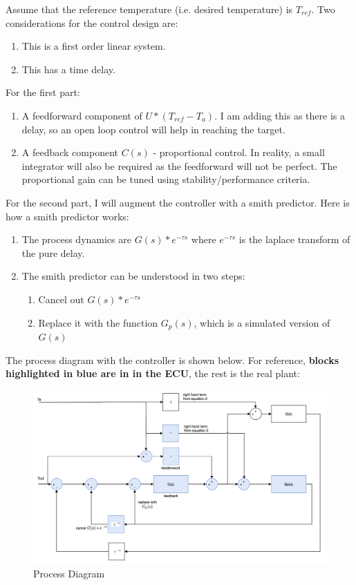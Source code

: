 Assume that the reference temperature (i.e. desired temperature) is \(T_{ref}\).
\noindent
\newline
\newline
Two considerations for the control design are:
\begin{enumerate}
  \item This is a first order linear system.
  \item This has a time delay.
\end{enumerate}
\noindent
For the first part:
\begin{enumerate}
  \item A feedforward component of \(U*(T_{ref} - T_a)\). I am adding this as there is a delay, so an open loop control will help in reaching the target.
  \item A feedback component \(C(s)\) - proportional control. In reality, a small integrator will also be required as the feedforward will not be perfect. The proportional gain can be tuned using stability/performance criteria.
\end{enumerate}
For the second part, I will augment the controller with a smith predictor. Here is how a smith predictor works:
\begin{enumerate}
  \item The process dynamics are \(G(s)*e^{-\tau s}\) where \(e^{-\tau s}\) is the laplace transform of the pure delay.
  \item The smith predictor can be understood in two steps:
  \begin{enumerate}
  \item Cancel out \(G(s)*e^{-\tau s}\)
  \item Replace it with the function \(G_p(s)\), which is a simulated version of \(G(s)\)
  \end{enumerate}
\end{enumerate}

\noindent
\newline
\newline
The process diagram with the controller is shown below. For reference, \textbf{blocks highlighted in \textcolor{TealBlue}{blue} are in in the ECU}, the rest is the real plant: \\

\begin{figure}[h!]
  \includegraphics[width=\textwidth]{control_diagram}
  \caption{Process Diagram}
\end{figure}

